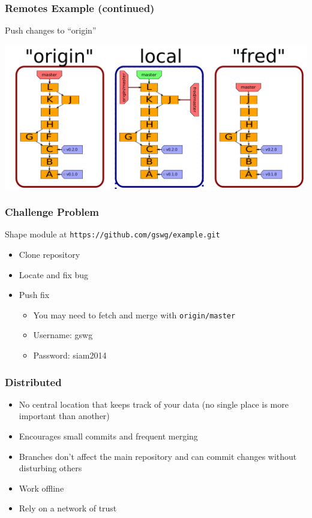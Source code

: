 \documentclass[english,compress]{beamer}
\begin{document}
\begin{frame}[fragile]
    \frametitle{Remotes Example (continued)}
	Push changes to ``origin''

	\begin{center}
		\includegraphics[width=.8\textwidth]{figs/push-fred}
	\end{center}
\end{frame}

\begin{frame}[fragile]
    \frametitle{Challenge Problem}

    Shape module at \verb|https://github.com/gswg/example.git|
    \begin{itemize}
        \item Clone repository
        \item Locate and fix bug
        \item Push fix
            \begin{itemize}
                \item You may need to fetch and merge with \verb|origin/master|
                \item Username: gswg
                \item Password: siam2014
            \end{itemize}
    \end{itemize}
\end{frame}

\frame
{
    \frametitle{Distributed}
    \begin{itemize}
        \item No central location that keeps track of your data (no single place is more important than another)
        \item Encourages small commits and frequent merging
        \item Branches don't affect the main repository and can commit changes without disturbing others
        \item Work offline
        \item Rely on a network of trust
    \end{itemize}
}
\end{document}
